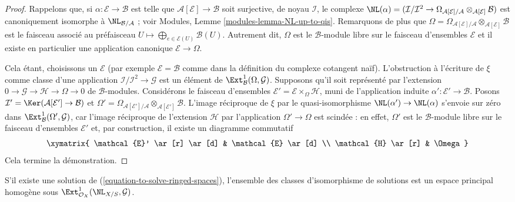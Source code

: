\begin{proof}
Rappelons que, si $\alpha : \mathcal{E} \to \mathcal{B}$ est telle que
$\mathcal{A}[\mathcal{E}] \to \mathcal{B}$ soit surjective, de noyau
$\mathcal{I}$, le complexe
$\NL(\alpha) = (\mathcal{I}/\mathcal{I}^2 \to 
\Omega_{\mathcal{A}[\mathcal{E}]/\mathcal{A}}
\otimes_{\mathcal{A}[\mathcal{E}]} \mathcal{B})$ est canoniquement
isomorphe à $\NL_{\mathcal{B}/\mathcal{A}}$ ; voir Modules, Lemme
\ref{modules-lemma-NL-up-to-qis}.
Remarquons de plus que
$\Omega = \Omega_{\mathcal{A}[\mathcal{E}]/\mathcal{A}}
\otimes_{\mathcal{A}[\mathcal{E}]} \mathcal{B}$ est le faisceau associé
au préfaisceau
$U \mapsto \bigoplus_{e \in \mathcal{E}(U)} \mathcal{B}(U)$.
Autrement dit, $\Omega$ est le $\mathcal{B}$-module libre sur le faisceau
d'ensembles $\mathcal{E}$ et il existe en particulier une application
canonique $\mathcal{E} \to \Omega$.

\medskip\noindent
Cela étant, choisissons un $\mathcal{E}$ (par exemple
$\mathcal{E} = \mathcal{B}$ comme dans la définition du complexe cotangent
naïf). L'obstruction à l'écriture de $\xi$ comme classe d'une application
$\mathcal{I}/\mathcal{I}^2 \to \mathcal{G}$ est un élément de
$\Ext^1_\mathcal{B}(\Omega, \mathcal{G})$. Supposons qu'il soit représenté
par l'extension
$0 \to \mathcal{G} \to \mathcal{H} \to \Omega \to 0$
de $\mathcal{B}$-modules. Considérons le faisceau d'ensembles
$\mathcal{E}' = \mathcal{E} \times_\Omega \mathcal{H}$,
muni de l'application induite $\alpha' : \mathcal{E}' \to \mathcal{B}$.
Posons $\mathcal{I}' = \Ker(\mathcal{A}[\mathcal{E}'] \to \mathcal{B})$
et $\Omega' = \Omega_{\mathcal{A}[\mathcal{E}']/\mathcal{A}}
\otimes_{\mathcal{A}[\mathcal{E}']} \mathcal{B}$.
L'image réciproque de $\xi$ par le quasi-isomorphisme
$\NL(\alpha') \to \NL(\alpha)$ s'envoie sur zéro dans
$\Ext^1_\mathcal{B}(\Omega', \mathcal{G})$, car l'image réciproque de
l'extension $\mathcal{H}$ par l'application $\Omega' \to \Omega$ est
scindée : en effet, $\Omega'$ est le $\mathcal{B}$-module libre sur le
faisceau d'ensembles $\mathcal{E}'$ et, par construction, il existe un
diagramme commutatif
$$
\xymatrix{
\mathcal{E}' \ar[r] \ar[d] & \mathcal{E} \ar[d] \\
\mathcal{H} \ar[r] & \Omega
}
$$
Cela termine la démonstration.
\end{proof}

\begin{lemma}
\label{lemma-choices-ringed-spaces}
S'il existe une solution de (\ref{equation-to-solve-ringed-spaces}),
l'ensemble des classes d'isomorphisme de solutions est un espace principal
homogène sous $\Ext^1_{\mathcal{O}_X}(\NL_{X/S}, \mathcal{G})$.
\end{lemma}

